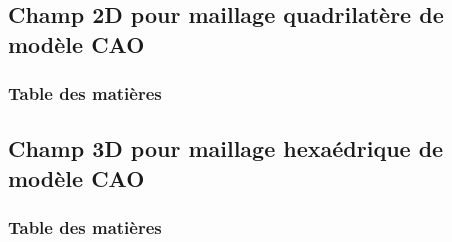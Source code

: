 \documentclass{beamer}
\begin{document}
\subsection{Champ 2D pour maillage quadrilatère de modèle CAO}
\begin{frame}
    \frametitle{Table des matières}
    \tableofcontents[currentsubsection, sectionstyle=show/shaded, subsectionstyle=show/shaded/hide]
\end{frame}

\subsection{Champ 3D pour maillage hexaédrique de modèle CAO}
\begin{frame}
    \frametitle{Table des matières}
    \tableofcontents[currentsubsection, sectionstyle=show/shaded, subsectionstyle=show/shaded/hide]
\end{frame}
\end{document}
